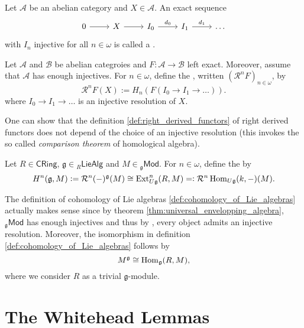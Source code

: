 \begin{definition}
	Let $\mathcal{A}$ be an abelian category and $X \in \mathcal{A}$. An exact sequence
	\begin{equation*}
		\begin{tikzcd}
			0 \arrow[r] & X \arrow[r] & I_0 \arrow[r,"d_0"] & I_1 \arrow[r,"d_1"] & \dots
		\end{tikzcd}
	\end{equation*}
	\noindent with $I_n$ injective for all $n \in \omega$ is called a .
\end{definition}

\begin{definition}
	\label{def:right_derived_functors}
	Let $\mathcal{A}$ and $\mathcal{B}$ be abelian categroies and $F : \mathcal{A} \to \mathcal{B}$ left exact. Moreover, assume that $\mathcal{A}$ has enough injectives. For $n \in \omega$, define the , written $(\mathcal{R}^nF)_{n \in \omega}$, by
	\begin{equation*}
		\mathcal{R}^nF(X) := H_n(F(I_0 \to I_1 \to \dots)).
	\end{equation*}
	\noindent where $I_0 \to I_1 \to \dots$ is an injective resolution of $X$.
\end{definition}

\begin{remark}
	One can show that the definition \ref{def:right_derived_functors} of right derived functors does not depend of the choice of an injective resolution (this invokes the so called \emph{comparison theorem} of homological algebra).
\end{remark}

\begin{definition}
	\label{def:cohomology_of_Lie_algebras}
	Let $R \in \mathsf{CRing}$, $\mathfrak{g} \in {_{R}\mathsf{LieAlg}}$ and $M \in {_{\mathfrak{g}}}\mathsf{Mod}$. For $n \in \omega$, define the  by
	\begin{equation*}
		H^n(\mathfrak{g},M) := \mathcal{R}^n(-)^\mathfrak{g}(M) \cong \operatorname{Ext}^n_{U\mathfrak{g}}(R,M) =: \mathcal{R}^n\operatorname{Hom}_{U\mathfrak{g}}(k,-)(M).
	\end{equation*}
\end{definition}

\begin{remark}
	The definition of cohomology of Lie algebras \ref{def:cohomology_of_Lie_algebras} actually makes sense since by theorem \ref{thm:universal_envelopping_algebra}, $_{\mathfrak{g}}\mathsf{Mod}$ has enough injectives and thus by \cite[40]{weibel:homological_algebra:1994}, every object admits an injective resolution. Moreover, the isomorphism in definition \ref{def:cohomology_of_Lie_algebras} follows by
	\begin{equation*}
		M^\mathfrak{g} \cong \operatorname{Hom}_{\mathfrak{g}}(R,M),
	\end{equation*}
	\noindent where we consider $R$ as a trivial $\mathfrak{g}$-module.
\end{remark}

\section*{The Whitehead Lemmas}

\printbibliography

